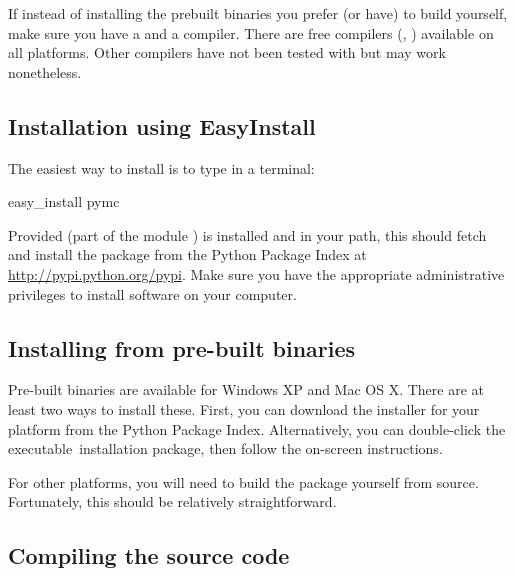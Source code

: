 \documentclass[]{jss}
\begin{document}
If instead of installing the prebuilt binaries you prefer (or have) to build
 yourself, make sure you have a  and a  compiler. There are free
compilers (,  \citep{gcc}) available on all platforms. Other compilers have not been
tested with  but may work nonetheless.



\subsection{Installation using EasyInstall}
  \label{installation-using-easyinstall}%


The easiest way to install  is to type in a terminal:
%
\begin{CodeInput}
easy_install pymc
\end{CodeInput}

Provided   (part of the  module \citep{setuptools}) is installed
and in your path, this should fetch and install the package from the
Python Package Index at \href{http://pypi.python.org/pypi}{http://pypi.python.org/pypi}. Make sure you have the appropriate administrative
privileges to install software on your computer.



\subsection{Installing from pre-built binaries}
  \label{installing-from-pre-built-binaries}%


Pre-built binaries are available for Windows XP and Mac OS X. There are at least
two ways to install these. First, you can download the installer for your platform from the Python Package Index. Alternatively, you can double-click the executable~installation package, then follow the
on-screen instructions.

For other platforms, you will need to build the package yourself from source.
Fortunately, this should be relatively straightforward.



\subsection{Compiling the source code}
  \label{compiling-the-source-code}%
\end{document}
